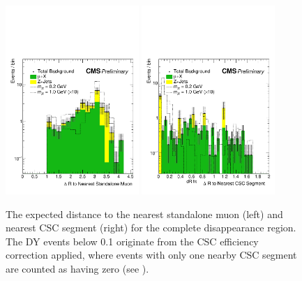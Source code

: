 \begin{figure}[htbp]
	\centering
	\includegraphics[width=0.45\textwidth]{figures/totDisappStaDr.pdf}
	\hspace{0.01\textwidth}
	\includegraphics[width=0.45\textwidth]{figures/totDisappCscDr.pdf}
	\caption[Expected Complete Disappearance Muon Chamber Features]{The expected distance to the nearest standalone muon (left) and nearest CSC segment (right) for the complete disappearance region. The DY events below 0.1 originate from the CSC efficiency correction applied, where events with only one nearby CSC segment are counted as having zero (see ).}
	\label{fig:totCSCStaDr}
\end{figure}

